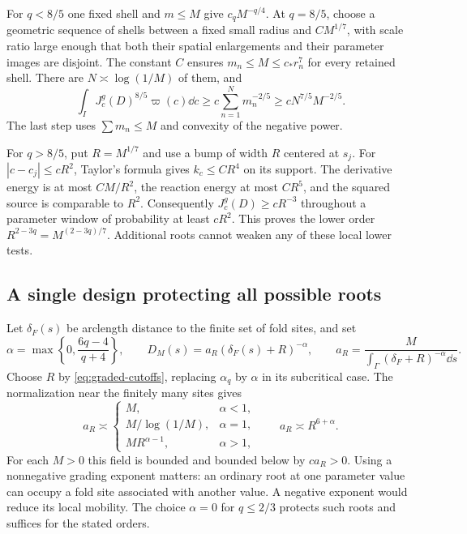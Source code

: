 For $q<8/5$ one fixed shell and $m\le M$ give $c_qM^{-q/4}$.
At $q=8/5$, choose a geometric sequence of shells between a fixed
small radius and $CM^{1/7}$, with scale ratio large enough that both
their spatial enlargements and their parameter images are disjoint.
The constant $C$ ensures $m_n\le M\le c_*r_n^7$ for every retained
shell. There are $N\asymp\log(1/M)$ of them, and
\begin{equation}\label{eq:generic-critical-lower}
 \int_I J_c^g(D)^{8/5}\varpi(c)\dd c
 \ge c\sum_{n=1}^Nm_n^{-2/5}
 \ge cN^{7/5}M^{-2/5}.
\end{equation}
The last step uses $\sum m_n\le M$ and convexity of the negative power.

For $q>8/5$, put $R=M^{1/7}$ and use a bump of width $R$ centered
at $s_j$. For $|c-c_j|\le cR^2$, Taylor's formula gives
$k_c\le CR^4$ on its support. The derivative energy is at most
$CM/R^2$, the reaction energy at most $CR^5$, and the squared source
is comparable to $R^2$. Consequently $J_c^g(D)\ge cR^{-3}$
throughout a parameter window of probability at least $cR^2$.
This proves the lower order $R^{2-3q}=M^{(2-3q)/7}$.
Additional roots cannot weaken any of these local lower tests.

\subsection{A single design protecting all possible roots}
Let $\delta_F(s)$ be arclength distance to the finite set of fold
sites, and set
\begin{equation}\label{eq:generic-design}
 \alpha=\max\left\{0,\frac{6q-4}{q+4}\right\},\qquad
 D_M(s)=a_R(\delta_F(s)+R)^{-\alpha},\qquad
 a_R=\frac{M}{\int_\Gamma(\delta_F+R)^{-\alpha}\dd s}.
\end{equation}
Choose $R$ by \eqref{eq:graded-cutoffs}, replacing $\alpha_q$ by
$\alpha$ in its subcritical case. The normalization near the finitely
many sites gives
\begin{equation}\label{eq:generic-normalization}
 a_R\asymp
 \begin{cases}
 M,&\alpha<1,\\
 M/\log(1/M),&\alpha=1,\\
 MR^{\alpha-1},&\alpha>1,
 \end{cases}
 \qquad a_R\asymp R^{6+\alpha}.
\end{equation}
For each $M>0$ this field is bounded and bounded below by $ca_R>0$.
Using a nonnegative grading exponent matters: an ordinary root at
one parameter value can occupy a fold site associated with another
value. A negative exponent would reduce its local mobility. The
choice $\alpha=0$ for $q\le2/3$ protects such roots and suffices
for the stated orders.

